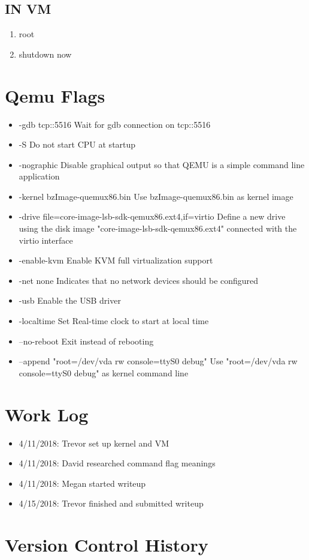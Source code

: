 \documentclass[letterpaper,10pt]{article}
\begin{document}
\subsection{IN VM}
\begin{enumerate}
  \item root
  \item shutdown now
\end{enumerate}

\section{Qemu Flags}
\begin{itemize}
  \item -gdb tcp::5516
    \subitem Wait for gdb connection on tcp::5516
  \item -S
    \subitem Do not start CPU at startup
  \item -nographic
    \subitem Disable graphical output so that QEMU is a simple command line application
  \item -kernel bzImage-quemux86.bin
    \subitem Use bzImage-quemux86.bin as kernel image
  \item -drive file=core-image-lsb-sdk-qemux86.ext4,if=virtio
    \subitem Define a new drive using the disk image "core-image-lsb-sdk-qemux86.ext4" connected with the virtio interface
  \item -enable-kvm
    \subitem Enable KVM full virtualization support
  \item -net none
    \subitem Indicates that no network devices should be configured
  \item -usb
    \subitem Enable the USB driver
  \item -localtime
    \subitem Set Real-time clock to start at local time
  \item --no-reboot
    \subitem Exit instead of rebooting
  \item --append "root=/dev/vda rw console=ttyS0 debug"
    \subitem Use "root=/dev/vda rw console=ttyS0 debug" as kernel command line
\end{itemize}

\section{Work Log}
\begin{itemize}
  \item 4/11/2018: Trevor set up kernel and VM
  \item 4/11/2018: David researched command flag meanings
  \item 4/11/2018: Megan started writeup
  \item 4/15/2018: Trevor finished and submitted writeup
\end{itemize}

\section{Version Control History}


\nocite{*}



\end{document}
